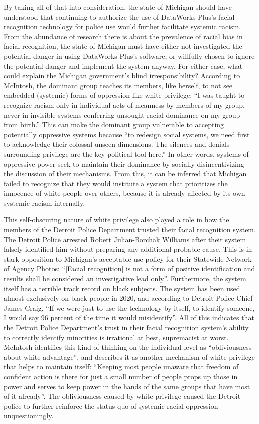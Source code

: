 \documentclass[12pt, letterpaper]{article}
\begin{document}
\begin{mla}
By taking all of that into consideration, the state of Michigan should have
understood that continuing to authorize the use of DataWorks Plus's facial
recognition technology for police use would further facilitate systemic
racism. From the abundance of research there is about the prevalence of racial
bias in facial recognition, the state of Michigan must have either not
investigated the potential danger in using DataWorks Plus's software, or
willfully chosen to ignore the potential danger and implement the system
anyway. For either case, what could explain the Michigan government's blind
irresponsibility? According to McIntosh, the dominant group teaches its
members, like herself, to not see embedded (systemic) forms of oppression like
white privilege: ``I was taught to recognize racism only in individual acts of
meanness by members of my group, never in invisible systems conferring
unsought racial dominance on my group from birth.'' This can make the dominant
group vulnerable to accepting potentially oppressive systems because ``to
redesign social systems, we need first to acknowledge their colossal unseen
dimensions. The silences and denials surrounding privilege are the key
political tool here.'' In other words, systems of oppressive power seek to
maintain their dominance by socially disincentivizing the discussion of their
mechanisms. From this, it can be inferred that Michigan failed to recognize
that they would institute a system that prioritizes the innocence of white
people over others, because it is already affected by its own systemic racism
internally.

This self-obscuring nature of white privilege also played a role in how the
members of the Detroit Police Department trusted their facial recognition
system. The Detroit Police arrested Robert Julian-Borchak Williams after their
system falsely identified him without preparing any additional probable cause.
This is in stark opposition to Michigan's acceptable use policy for their
Statewide Network of Agency Photos: ``[Facial recognition] is not a form of
positive identification and results shall be considered an investigative lead
only''. Furthermore, the system itself has a terrible track record on black
subjects. The system has been used almost exclusively on black people in 2020,
and according to Detroit Police Chief James Craig, ``If we were just to use
the technology by itself, to identify someone, I would say 96 percent of the
time it would misidentify''. All of this indicates that the Detroit Police
Department's trust in their facial recognition system's ability to correctly
identify minorities is irrational at best, supremacist at worst. McIntosh
identifies this kind of thinking on the individual level as ``obliviousness
about white advantage'', and describes it as another mechanism of white
privilege that helps to maintain itself: ``Keeping most people unaware that
freedom of confident action is there for just a small number of people props
up those in power and serves to keep power in the hands of the same groups
that have most of it already''. The obliviousness caused by white privilege
caused the Detroit police to further reinforce the status quo of systemic
racial oppression unquestioningly.


\end{mla}
\end{document}
